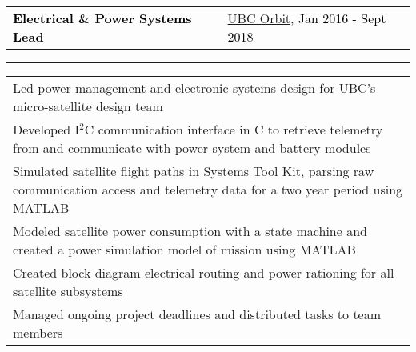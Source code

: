 \documentclass[10pt,letterpaper]{article}
\newcommand{\mpwidth}{\linewidth-\fboxsep-\fboxsep}
\newcommand{\tzlarrow}{(0,0) -- (0.2,0) -- (0.3,0.2) -- (0.2,0.4) -- (0,0.4) -- (0.1,0.2) -- cycle;}
\newcommand{\larrow}[1]
{\begin{tikzpicture}[scale=0.58]
	 \filldraw[fill=#1!100,draw=#1!100!black]  \tzlarrow
 \end{tikzpicture}
}
\newcommand{\cvsection}[1]
{
\colorbox{sectcol}{\mystrut \makebox[1\mpwidth][l]{
\textcolor{white}{\uppercase{#1}}}}\\
}
\newcommand{\cvbigevent}[9]
{
\vspace{8pt}
	\begin{tabular*}{0.2\mpwidth}{p{0.4\mpwidth}  x{0.575\mpwidth}}
 	\textcolor{black}{\textbf{#2}} & \textcolor{complcol}{#3}, \textcolor{black}{#1} 

	\end{tabular*}
\vspace{-12pt}
\textcolor{softcol}{\hrule}
\vspace{6pt}
	\begin{tabular*}{0.5\mpwidth}{p{\mpwidth}}
\larrow{softcol}  #4\\[6pt]
\larrow{softcol}  #5\\[6pt]
\larrow{softcol}  #6\\[6pt]
\larrow{softcol}  #7\\[6pt]
\larrow{softcol}  #8\\[6pt]
\larrow{softcol}  #9\\[6pt]
	\end{tabular*}

}
\newcommand{\mystrut}{\rule[-.3\baselineskip]{0pt}{\baselineskip}}
\begin{document}
{\begin{minipage}[c][0.95\textheight][t]{0.69\linewidth}






\vspace{12pt}


\cvsection{Design Team}


\cvbigevent{Jan 2016 - Sept 2018}{Electrical \& Power Systems Lead}{\href{https://www.ubcorbit.com/}{UBC Orbit}}{Led power management and electronic systems design for UBC's micro-satellite design team}{Developed I$^2$C communication interface in C to retrieve telemetry from and communicate with power system and battery modules}{Simulated satellite flight paths in Systems Tool Kit, parsing raw communication access and telemetry data for a two year period using MATLAB}{Modeled satellite power consumption with a state machine and created a power simulation model of mission using MATLAB}{Created block diagram electrical routing and power rationing for all satellite subsystems}{Managed ongoing project deadlines and distributed tasks to team members}






\end{minipage}}%
\end{document}
